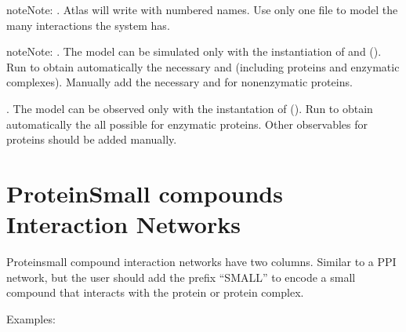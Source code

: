 \documentclass[letterpaper,10pt,english]{sphinxmanual}
\begin{document}
\begin{sphinxadmonition}{note}{Note:}
. Atlas will write  with numbered
names. Use only one file to model the many interactions the system has.
\end{sphinxadmonition}

\begin{sphinxadmonition}{note}{Note:}
. The model can be simulated only with the instantiation of
 and  ().
Run  to obtain
automatically the necessary  and  (including
proteins and enzymatic complexes). Manually add the necessary 
and  for non\sphinxhyphen{}enzymatic proteins.

. The model can be observed only with the instantation of
 ().
Run  to obtain
automatically the all possible  for enzymatic proteins. Other
observables for proteins should be added manually.
\end{sphinxadmonition}


\section{Protein\sphinxhyphen{}Small compounds Interaction Networks}
\label{\detokenize{NetProteinSmallCompounds:protein-small-compounds-interaction-networks}}\label{\detokenize{NetProteinSmallCompounds:net-protein-smallcompounds}}\label{\detokenize{NetProteinSmallCompounds::doc}}
Protein\sphinxhyphen{}small compound interaction networks have two columns. Similar to a PPI
network, but the user should add the prefix “SMALL\sphinxhyphen{}” to encode a small compound
that interacts with the protein or protein complex.

Examples:
\end{document}
